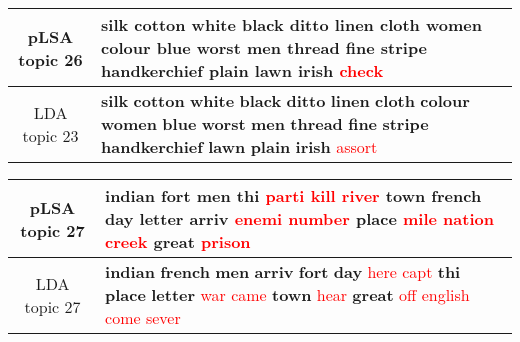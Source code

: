 \begin{center}\begin{tabularx}{\textwidth} {
  | c | >{\raggedright\arraybackslash}X | } \hline 
pLSA topic 26 & \textbf{silk} \textbf{cotton} \textbf{white} \textbf{black} \textbf{ditto} \textbf{linen} \textbf{cloth} \textbf{women} \textbf{colour} \textbf{blue} \textbf{worst} \textbf{men} \textbf{thread} \textbf{fine} \textbf{stripe} \textbf{handkerchief} \textbf{plain} \textbf{lawn} \textbf{irish} \textcolor{red}{check} \\ \hline 
LDA topic 23 & \textbf{silk} \textbf{cotton} \textbf{white} \textbf{black} \textbf{ditto} \textbf{linen} \textbf{cloth} \textbf{colour} \textbf{women} \textbf{blue} \textbf{worst} \textbf{men} \textbf{thread} \textbf{fine} \textbf{stripe} \textbf{handkerchief} \textbf{lawn} \textbf{plain} \textbf{irish} \textcolor{red}{assort} \\ \hline 
\end{tabularx}

\end{center}

\begin{center}\begin{tabularx}{\textwidth} {
  | c | >{\raggedright\arraybackslash}X | } \hline 
pLSA topic 27 & \textbf{indian} \textbf{fort} \textbf{men} \textbf{thi} \textcolor{red}{parti} \textcolor{red}{kill} \textcolor{red}{river} \textbf{town} \textbf{french} \textbf{day} \textbf{letter} \textbf{arriv} \textcolor{red}{enemi} \textcolor{red}{number} \textbf{place} \textcolor{red}{mile} \textcolor{red}{nation} \textcolor{red}{creek} \textbf{great} \textcolor{red}{prison} \\ \hline 
LDA topic 27 & \textbf{indian} \textbf{french} \textbf{men} \textbf{arriv} \textbf{fort} \textbf{day} \textcolor{red}{here} \textcolor{red}{capt} \textbf{thi} \textbf{place} \textbf{letter} \textcolor{red}{war} \textcolor{red}{came} \textbf{town} \textcolor{red}{hear} \textbf{great} \textcolor{red}{off} \textcolor{red}{english} \textcolor{red}{come} \textcolor{red}{sever} \\ \hline 
\end{tabularx}

\end{center}

